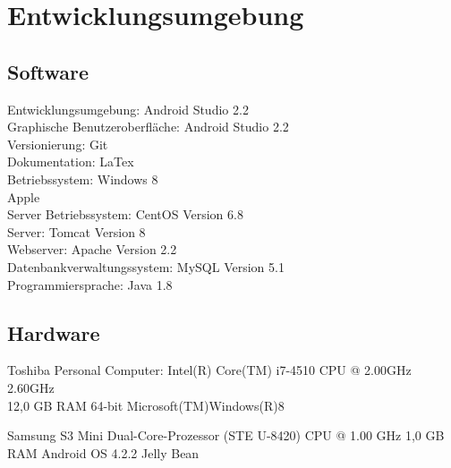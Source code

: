 \section{Entwicklungsumgebung}

\subsection{Software}
Entwicklungsumgebung: 				Android Studio 2.2\\
Graphische Benutzeroberfläche: 		Android Studio 2.2\\
Versionierung: 						Git\\
Dokumentation:						LaTex\\
Betriebssystem: 					Windows 8\\
									Apple\\
Server Betriebssystem:				CentOS Version 6.8\\
Server:								Tomcat Version 8\\
Webserver:							Apache Version 2.2\\
Datenbankverwaltungssystem: 		MySQL Version 5.1\\
Programmiersprache:					Java 1.8\\

\subsection{Hardware}

Toshiba Personal Computer:			Intel(R) Core(TM) i7-4510 CPU @ 2.00GHz 2.60GHz\\
									12,0 GB RAM
									64-bit Microsoft(TM)Windows(R)8
									
Samsung S3 Mini						Dual-Core-Prozessor (STE U-8420) CPU @ 1.00 GHz
									1,0 GB RAM
									Android OS 4.2.2 Jelly Bean\\
